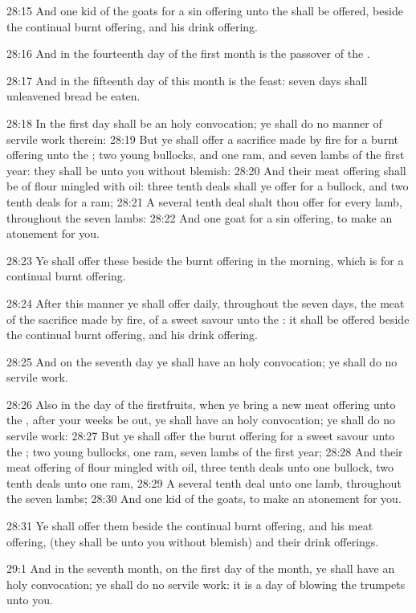 28:15 And one kid of the goats for a sin offering unto the \LORD shall be offered, beside the continual burnt offering, and his drink offering.

28:16 And in the fourteenth day of the first month is the passover of the \LORD.

28:17 And in the fifteenth day of this month is the feast: seven days shall unleavened bread be eaten.

28:18 In the first day shall be an holy convocation; ye shall do no manner of servile work therein: 28:19 But ye shall offer a sacrifice made by fire for a burnt offering unto the \LORD; two young bullocks, and one ram, and seven lambs of the first year: they shall be unto you without blemish: 28:20 And their meat offering shall be of flour mingled with oil: three tenth deals shall ye offer for a bullock, and two tenth deals for a ram; 28:21 A several tenth deal shalt thou offer for every lamb, throughout the seven lambs: 28:22 And one goat for a sin offering, to make an atonement for you.

28:23 Ye shall offer these beside the burnt offering in the morning, which is for a continual burnt offering.

28:24 After this manner ye shall offer daily, throughout the seven days, the meat of the sacrifice made by fire, of a sweet savour unto the \LORD: it shall be offered beside the continual burnt offering, and his drink offering.

28:25 And on the seventh day ye shall have an holy convocation; ye shall do no servile work.

28:26 Also in the day of the firstfruits, when ye bring a new meat offering unto the \LORD, after your weeks be out, ye shall have an holy convocation; ye shall do no servile work: 28:27 But ye shall offer the burnt offering for a sweet savour unto the \LORD; two young bullocks, one ram, seven lambs of the first year; 28:28 And their meat offering of flour mingled with oil, three tenth deals unto one bullock, two tenth deals unto one ram, 28:29 A several tenth deal unto one lamb, throughout the seven lambs; 28:30 And one kid of the goats, to make an atonement for you.

28:31 Ye shall offer them beside the continual burnt offering, and his meat offering, (they shall be unto you without blemish) and their drink offerings.

29:1 And in the seventh month, on the first day of the month, ye shall have an holy convocation; ye shall do no servile work: it is a day of blowing the trumpets unto you.

